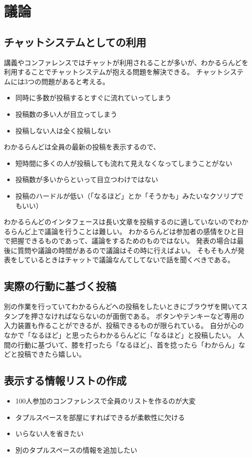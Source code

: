 \section{議論}

\subsection{チャットシステムとしての利用}
講義やコンファレンスではチャットが利用されることが多いが、わかるらんどを利用することでチャットシステムが抱える問題を解決できる。
チャットシステムには3つの問題があると考える。

\begin{itemize}
\item 同時に多数が投稿するとすぐに流れていってしまう
\item 投稿数の多い人が目立ってしまう
\item 投稿しない人は全く投稿しない
\end{itemize}

わかるらんどは全員の最新の投稿を表示するので、

\begin{itemize}
\item 短時間に多くの人が投稿しても流れて見えなくなってしまうことがない
\item 投稿数が多いからといって目立つわけではない
\item 投稿のハードルが低い（「なるほど」とか「そうかも」みたいなクソリプでもいい）
\end{itemize}

わかるらんどのインタフェースは長い文章を投稿するのに適していないのでわかるらんど上で議論を行うことは難しい。
わかるらんどは参加者の感情をひと目で把握できるものであって、議論をするためのものではない。
発表の場合は最後に質問や議論の時間があるので議論はその時に行えばよい。
そもそも人が発表をしているときはチャットで議論なんてしてないで話を聞くべきである。

\subsection{実際の行動に基づく投稿}

別の作業を行っていてわかるらんどへの投稿をしたいときにブラウザを開いてスタンプを押さなければならないのが面倒である。
ボタンやテンキーなど専用の入力装置も作ることができるが、投稿できるものが限られている。
自分が心のなかで「なるほど」と思ったらわかるらんどに「なるほど」と投稿したい。
人間の行動に基づいて、膝を打ったら「なるほど」、首を捻ったら「わからん」などと投稿できたら嬉しい。

\subsection{表示する情報リストの作成}

\begin{itemize}
\item 100人参加のコンファレンスで全員のリストを作るのが大変
\item タプルスペースを部屋にすればできるが柔軟性に欠ける
\item いらない人を省きたい
\item 別のタプルスペースの情報を追加したい
\end{itemize}